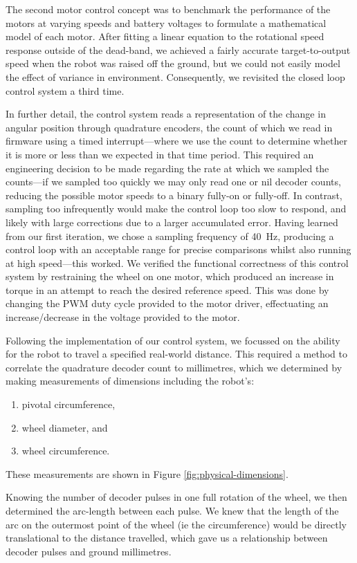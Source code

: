 \documentclass[conference]{IEEEtran}
\begin{document}
The second motor control concept was to benchmark the performance of the motors at varying speeds and battery voltages to formulate a mathematical model of each motor.
After fitting a linear equation to the rotational speed response outside of the dead-band, we achieved a fairly accurate target-to-output speed when the robot was raised off the ground, but we could not easily model the effect of variance in environment.
Consequently, we revisited the closed loop control system a third time.

In further detail, the control system reads a representation of the change in angular position through quadrature encoders, the count of which we read in firmware using a timed interrupt—where we use the count to determine whether it is more or less than we expected in that time period.
This required an engineering decision to be made regarding the rate at which we sampled the counts—if we sampled too quickly we may only read one or nil decoder counts, reducing the possible motor speeds to a binary fully-on or fully-off.
In contrast, sampling too infrequently would make the control loop too slow to respond, and likely with large corrections due to a larger accumulated error.
Having learned from our first iteration, we chose a sampling frequency of \qty{40}{\hertz}, producing a control loop with an acceptable range for precise comparisons whilst also running at high speed—this worked.
We verified the functional correctness of this control system by restraining the wheel on one motor, which produced an increase in torque in an attempt to reach the desired reference speed.
This was done by changing the PWM duty cycle provided to the motor driver, effectuating an increase/decrease in the voltage provided to the motor.

Following the implementation of our control system, we focussed on the ability for the robot to travel a specified real-world distance.
This required a method to correlate the quadrature decoder count to millimetres, which we determined by making measurements of dimensions including the robot's:
\begin{enumerate}
	\item pivotal circumference,
	\item wheel diameter, and
	\item wheel circumference.
\end{enumerate}
These measurements are shown in Figure \ref{fig:physical-dimensions}.

Knowing the number of decoder pulses in one full rotation of the wheel, we then determined the arc-length between each pulse. We knew that the length of the arc on the outermost point of the wheel (ie the circumference) would be directly translational to the distance travelled, which gave us a relationship between decoder pulses and ground millimetres.
\end{document}
